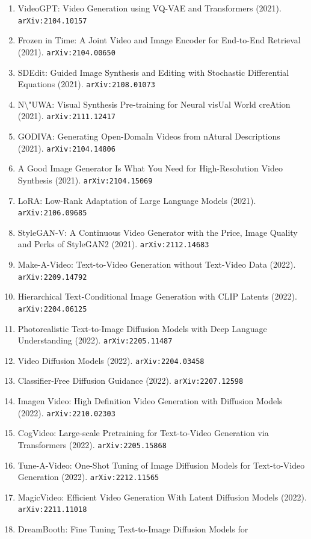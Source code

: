 \documentclass[11pt]{article}
\begin{document}
\begin{enumerate}
  \item VideoGPT: Video Generation using VQ-VAE and Transformers (2021). \texttt{arXiv:2104.10157}
  \item Frozen in Time: A Joint Video and Image Encoder for End-to-End Retrieval (2021). \texttt{arXiv:2104.00650}
  \item SDEdit: Guided Image Synthesis and Editing with Stochastic Differential
  Equations (2021). \texttt{arXiv:2108.01073}
  \item N\textbackslash{}"UWA: Visual Synthesis Pre-training for Neural visUal World creAtion (2021). \texttt{arXiv:2111.12417}
  \item GODIVA: Generating Open-DomaIn Videos from nAtural Descriptions (2021). \texttt{arXiv:2104.14806}
  \item A Good Image Generator Is What You Need for High-Resolution Video
  Synthesis (2021). \texttt{arXiv:2104.15069}
  \item LoRA: Low-Rank Adaptation of Large Language Models (2021). \texttt{arXiv:2106.09685}
  \item StyleGAN-V: A Continuous Video Generator with the Price, Image Quality
  and Perks of StyleGAN2 (2021). \texttt{arXiv:2112.14683}
  \item Make-A-Video: Text-to-Video Generation without Text-Video Data (2022). \texttt{arXiv:2209.14792}
  \item Hierarchical Text-Conditional Image Generation with CLIP Latents (2022). \texttt{arXiv:2204.06125}
  \item Photorealistic Text-to-Image Diffusion Models with Deep Language
  Understanding (2022). \texttt{arXiv:2205.11487}
  \item Video Diffusion Models (2022). \texttt{arXiv:2204.03458}
  \item Classifier-Free Diffusion Guidance (2022). \texttt{arXiv:2207.12598}
  \item Imagen Video: High Definition Video Generation with Diffusion Models (2022). \texttt{arXiv:2210.02303}
  \item CogVideo: Large-scale Pretraining for Text-to-Video Generation via
  Transformers (2022). \texttt{arXiv:2205.15868}
  \item Tune-A-Video: One-Shot Tuning of Image Diffusion Models for
  Text-to-Video Generation (2022). \texttt{arXiv:2212.11565}
  \item MagicVideo: Efficient Video Generation With Latent Diffusion Models (2022). \texttt{arXiv:2211.11018}
  \item DreamBooth: Fine Tuning Text-to-Image Diffusion Models for

\end{enumerate}
\end{document}
